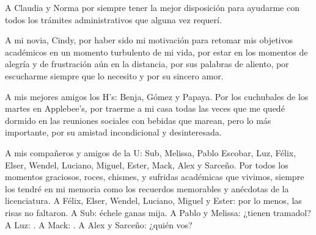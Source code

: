 A Claudia y Norma por siempre tener la mejor disposición para ayudarme 
con todos los trámites administrativos que alguna vez requerí. 

A mi novia, Cindy, por haber sido mi motivación para retomar mis 
objetivos académicos en un momento turbulento de mi vida, 
por estar en los momentos de alegría y de frustración aún en la distancia, 
por sus palabras de aliento, por escucharme siempre que lo necesito y 
por su sincero amor.

A mis mejores amigos los H's: Benja, Gómez y Papaya. Por los cuchubales de
los martes en Applebee's, por traerme a mi casa todas las veces que 
me quedé dormido en las reuniones sociales con bebidas que marean, 
pero lo más importante, por su amistad 
incondicional y desinteresada.

A mis compañeros y amigos de la U: Sub, Melissa, Pablo Escobar, 
Luz, Félix, Elser, Wendel, Luciano, Miguel, Ester, Mack, Alex y Sarceño.
Por todos los momentos graciosos, roces, chismes, y sufridas académicas 
que vivimos, siempre los tendré en mi memoria como los recuerdos memorables y 
anécdotas de la licenciatura. A Félix, Elser, Wendel, Luciano, Miguel y Ester: 
por lo menos, las risas no faltaron. A Sub: échele ganas mija. 
A Pablo y Melissa: ¿tienen tramadol? A Luz: . A Mack: . A
Alex y Sarceño: ¿quién vos?
% 